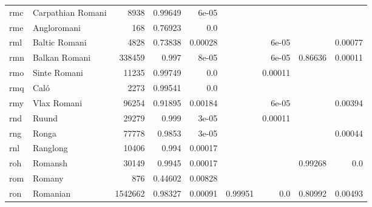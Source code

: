 \documentclass[11pt]{article}
\begin{document}
\begin{table*}[h]
{\begin{tabular}{llrrrrrrr}
rmc         & Carpathian Romani         & 8938         & 0.99649         & 6e-05         &          &          &          &          \\

rme         & Angloromani         & 168         & 0.76923         & 0.0         &          &          &          &          \\

rml         & Baltic Romani         & 4828         & 0.73838         & 0.00028         &          & 6e-05         &          & 0.00077         \\

rmn         & Balkan Romani         & 338459         & 0.997         & 8e-05         &          & 6e-05         & 0.86636         & 0.00011         \\

rmo         & Sinte Romani         & 11235         & 0.99749         & 0.0         &          & 0.00011         &          &          \\

rmq         & Caló         & 2273         & 0.99541         & 0.0         &          &          &          &          \\

rmy         & Vlax Romani         & 96254         & 0.91895         & 0.00184         &          & 6e-05         &          & 0.00394         \\

rnd         & Ruund         & 29279         & 0.999         & 3e-05         &          & 0.00011         &          &          \\

rng         & Ronga         & 77778         & 0.9853         & 3e-05         &          &          &          & 0.00044         \\

rnl         & Ranglong         & 10406         & 0.994         & 0.00017         &          &          &          &          \\

roh         & Romansh         & 30149         & 0.9945         & 0.00017         &          &          & 0.99268         & 0.0         \\

rom         & Romany         & 876         & 0.44602         & 0.00828         &          &          &          &          \\

ron         & Romanian         & 1542662         & 0.98327         & 0.00091         & 0.99951         & 0.0         & 0.80992         & 0.00493         \\


\end{tabular}}
\end{table*}
\end{document}
